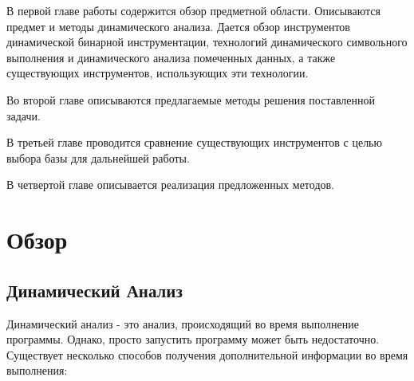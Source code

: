В первой главе работы содержится обзор предметной области. Описываются предмет и методы динамического анализа. Дается обзор инструментов динамической бинарной инструментации, технологий динамического символьного выполнения и динамического анализа помеченных данных, а также существующих инструментов, использующих эти технологии.

Во второй главе описываются предлагаемые методы решения поставленной задачи.

В третьей главе проводится сравнение существующих инструментов с целью выбора базы для дальнейшей работы.

В четвертой главе описывается реализация предложенных методов.



\chapter{Обзор}


\section{Динамический Анализ}

Динамический анализ - это анализ, происходящий во время выполнение программы. Однако, просто запустить программу может быть недостаточно. Существует несколько способов получения дополнительной информации во время выполнения:

